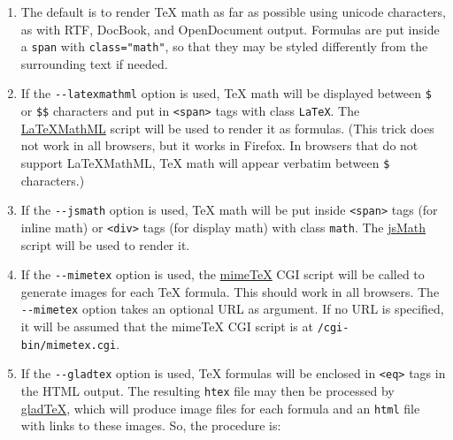 \documentclass[]{article}
\begin{document}
\begin{description}
\begin{enumerate}
\def\labelenumi{\arabic{enumi}.}
\item
  The default is to render TeX math as far as possible using unicode
  characters, as with RTF, DocBook, and OpenDocument output. Formulas
  are put inside a \texttt{span} with \texttt{class="math"}, so that
  they may be styled differently from the surrounding text if needed.
\item
  If the \texttt{-{}-latexmathml} option is used, TeX math will be
  displayed between \texttt{\$} or \texttt{\$\$} characters and put in
  \texttt{\textless{}span\textgreater{}} tags with class \texttt{LaTeX}.
  The \href{http://math.etsu.edu/LaTeXMathML/}{LaTeXMathML} script will
  be used to render it as formulas. (This trick does not work in all
  browsers, but it works in Firefox. In browsers that do not support
  LaTeXMathML, TeX math will appear verbatim between \texttt{\$}
  characters.)
\item
  If the \texttt{-{}-jsmath} option is used, TeX math will be put inside
  \texttt{\textless{}span\textgreater{}} tags (for inline math) or
  \texttt{\textless{}div\textgreater{}} tags (for display math) with
  class \texttt{math}. The
  \href{http://www.math.union.edu/~dpvc/jsmath/}{jsMath} script will be
  used to render it.
\item
  If the \texttt{-{}-mimetex} option is used, the
  \href{http://www.forkosh.com/mimetex.html}{mimeTeX} CGI script will be
  called to generate images for each TeX formula. This should work in
  all browsers. The \texttt{-{}-mimetex} option takes an optional URL as
  argument. If no URL is specified, it will be assumed that the mimeTeX
  CGI script is at \texttt{/cgi-bin/mimetex.cgi}.
\item
  If the \texttt{-{}-gladtex} option is used, TeX formulas will be
  enclosed in \texttt{\textless{}eq\textgreater{}} tags in the HTML
  output. The resulting \texttt{htex} file may then be processed by
  \href{http://ans.hsh.no/home/mgg/gladtex/}{gladTeX}, which will
  produce image files for each formula and an \texttt{html} file with
  links to these images. So, the procedure is:


\end{enumerate}
\end{description}
\end{document}
